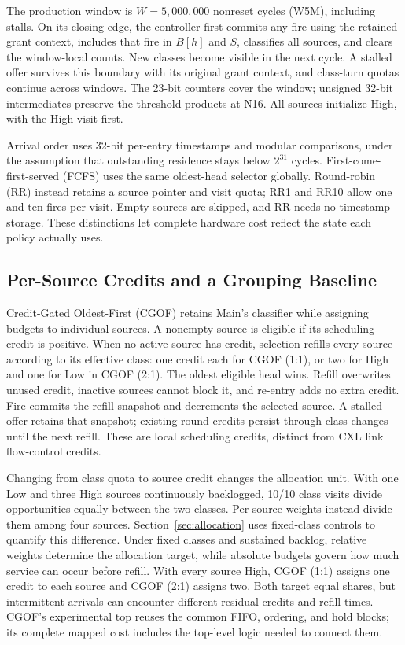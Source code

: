 The production window is $W=5{,}000{,}000$ nonreset cycles (W5M), including stalls. On its closing edge, the controller first commits any fire using the retained grant context, includes that fire in $B[h]$ and $S$, classifies all sources, and clears the window-local counts. New classes become visible in the next cycle. A stalled offer survives this boundary with its original grant context, and class-turn quotas continue across windows. The 23-bit counters cover the window; unsigned 32-bit intermediates preserve the threshold products at N16. All sources initialize High, with the High visit first.

Arrival order uses 32-bit per-entry timestamps and modular comparisons, under the assumption that outstanding residence stays below $2^{31}$ cycles. First-come-first-served (FCFS) uses the same oldest-head selector globally. Round-robin (RR) instead retains a source pointer and visit quota; RR1 and RR10 allow one and ten fires per visit. Empty sources are skipped, and RR needs no timestamp storage. These distinctions let complete hardware cost reflect the state each policy actually uses.

\subsection{Per-Source Credits and a Grouping Baseline}
Credit-Gated Oldest-First (CGOF) retains Main's classifier while assigning budgets to individual sources. A nonempty source is eligible if its scheduling credit is positive. When no active source has credit, selection refills every source according to its effective class: one credit each for CGOF (1:1), or two for High and one for Low in CGOF (2:1). The oldest eligible head wins. Refill overwrites unused credit, inactive sources cannot block it, and re-entry adds no extra credit. Fire commits the refill snapshot and decrements the selected source. A stalled offer retains that snapshot; existing round credits persist through class changes until the next refill. These are local scheduling credits, distinct from CXL link flow-control credits.

Changing from class quota to source credit changes the allocation unit. With one Low and three High sources continuously backlogged, 10/10 class visits divide opportunities equally between the two classes. Per-source weights instead divide them among four sources. Section~\ref{sec:allocation} uses fixed-class controls to quantify this difference. Under fixed classes and sustained backlog, relative weights determine the allocation target, while absolute budgets govern how much service can occur before refill. With every source High, CGOF (1:1) assigns one credit to each source and CGOF (2:1) assigns two. Both target equal shares, but intermittent arrivals can encounter different residual credits and refill times. CGOF's experimental top reuses the common FIFO, ordering, and hold blocks; its complete mapped cost includes the top-level logic needed to connect them.

